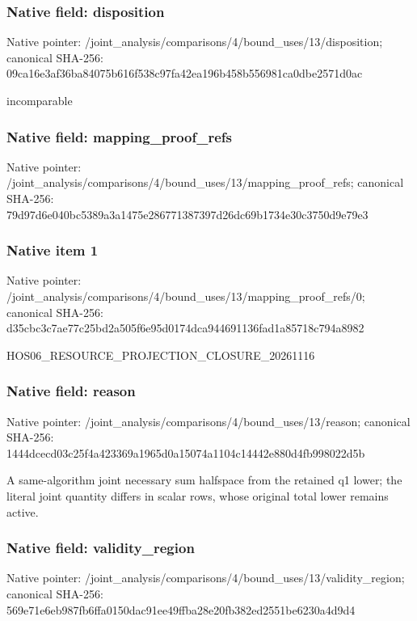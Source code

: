 \documentclass[10pt,a4paper]{article}
\begin{document}
\subsubsection{Native field: disposition}
Native pointer: /joint\_\allowbreak{}analysis/comparisons/4/bound\_\allowbreak{}uses/13/disposition; canonical SHA-256: 09ca16e3af36ba84075b616f538c97fa42ea196b458b556981ca0dbe2571d0ac

\begingroup\raggedright\sloppy incomparable\par\endgroup

\subsubsection{Native field: mapping\_\allowbreak{}proof\_\allowbreak{}refs}
Native pointer: /joint\_\allowbreak{}analysis/comparisons/4/bound\_\allowbreak{}uses/13/mapping\_\allowbreak{}proof\_\allowbreak{}refs; canonical SHA-256: 79d97d6e040bc5389a3a1475e286771387397d26dc69b1734e30c3750d9e79e3

\subsubsection{Native item 1}
Native pointer: /joint\_\allowbreak{}analysis/comparisons/4/bound\_\allowbreak{}uses/13/mapping\_\allowbreak{}proof\_\allowbreak{}refs/0; canonical SHA-256: d35cbc3c7ae77c25bd2a505f6e95d0174dca944691136fad1a85718c794a8982

\begingroup\raggedright\sloppy HOS06\_\allowbreak{}RESOURCE\_\allowbreak{}PROJECTION\_\allowbreak{}CLOSURE\_\allowbreak{}20261116\par\endgroup

\subsubsection{Native field: reason}
Native pointer: /joint\_\allowbreak{}analysis/comparisons/4/bound\_\allowbreak{}uses/13/reason; canonical SHA-256: 1444dcecd03c25f4a423369a1965d0a15074a1104c14442e880d4fb998022d5b

\begingroup\raggedright\sloppy A same-algorithm joint necessary sum halfspace from the retained q1 lower;\allowbreak{} the literal joint quantity differs in scalar rows,\allowbreak{} whose original total lower remains active.\par\endgroup

\subsubsection{Native field: validity\_\allowbreak{}region}
Native pointer: /joint\_\allowbreak{}analysis/comparisons/4/bound\_\allowbreak{}uses/13/validity\_\allowbreak{}region; canonical SHA-256: 569e71e6eb987fb6ffa0150dac91ee49ffba28e20fb382ed2551be6230a4d9d4
\end{document}
